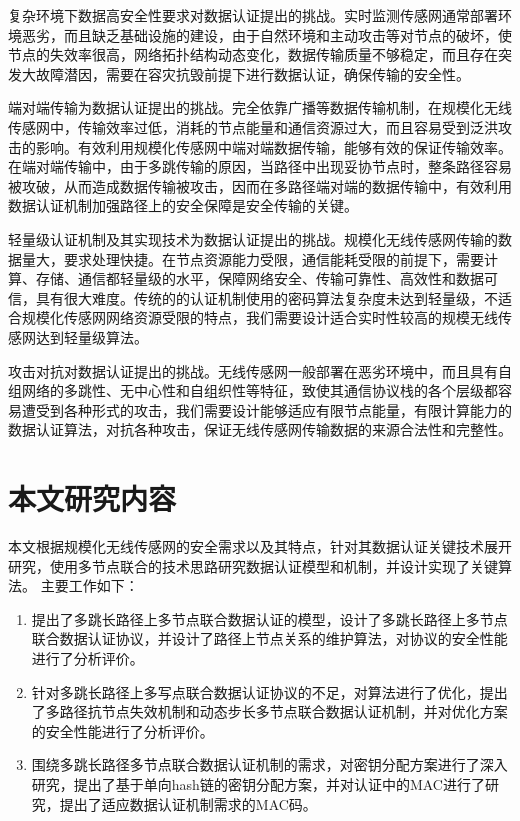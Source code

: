 复杂环境下数据高安全性要求对数据认证提出的挑战。实时监测传感网通常部署环境恶劣，而且缺乏基础设施的建设，由于自然环境和主动攻击等对节点的破坏，使节点的失效率很高，网络拓扑结构动态变化，数据传输质量不够稳定，而且存在突发大故障潜因，需要在容灾抗毁前提下进行数据认证，确保传输的安全性。

端对端传输为数据认证提出的挑战。完全依靠广播等数据传输机制，在规模化无线传感网中，传输效率过低，消耗的节点能量和通信资源过大，而且容易受到泛洪攻击的影响。有效利用规模化传感网中端对端数据传输，能够有效的保证传输效率。在端对端传输中，由于多跳传输的原因，当路径中出现妥协节点时，整条路径容易被攻破，从而造成数据传输被攻击，因而在多路径端对端的数据传输中，有效利用数据认证机制加强路径上的安全保障是安全传输的关键。

轻量级认证机制及其实现技术为数据认证提出的挑战。规模化无线传感网传输的数据量大，要求处理快捷。在节点资源能力受限，通信能耗受限的前提下，需要计算、存储、通信都轻量级的水平，保障网络安全、传输可靠性、高效性和数据可信，具有很大难度。传统的的认证机制使用的密码算法复杂度未达到轻量级，不适合规模化传感网网络资源受限的特点，我们需要设计适合实时性较高的规模无线传感网达到轻量级算法。

攻击对抗对数据认证提出的挑战。无线传感网一般部署在恶劣环境中，而且具有自组网络的多跳性、无中心性和自组织性等特征，致使其通信协议栈的各个层级都容易遭受到各种形式的攻击，我们需要设计能够适应有限节点能量，有限计算能力的数据认证算法，对抗各种攻击，保证无线传感网传输数据的来源合法性和完整性。

\section{本文研究内容}
本文根据规模化无线传感网的安全需求以及其特点，针对其数据认证关键技术展开研究，使用多节点联合的技术思路研究数据认证模型和机制，并设计实现了关键算法。
主要工作如下：

\begin{enumerate}\setlength{\itemsep}{-\itemsep}
  \item 提出了多跳长路径上多节点联合数据认证的模型，设计了多跳长路径上多节点联合数据认证协议，并设计了路径上节点关系的维护算法，对协议的安全性能进行了分析评价。
  \item 针对多跳长路径上多写点联合数据认证协议的不足，对算法进行了优化，提出了多路径抗节点失效机制和动态步长多节点联合数据认证机制，并对优化方案的安全性能进行了分析评价。
  \item 围绕多跳长路径多节点联合数据认证机制的需求，对密钥分配方案进行了深入研究，提出了基于单向hash链的密钥分配方案，并对认证中的MAC进行了研究，提出了适应数据认证机制需求的MAC码。
\end{enumerate}


